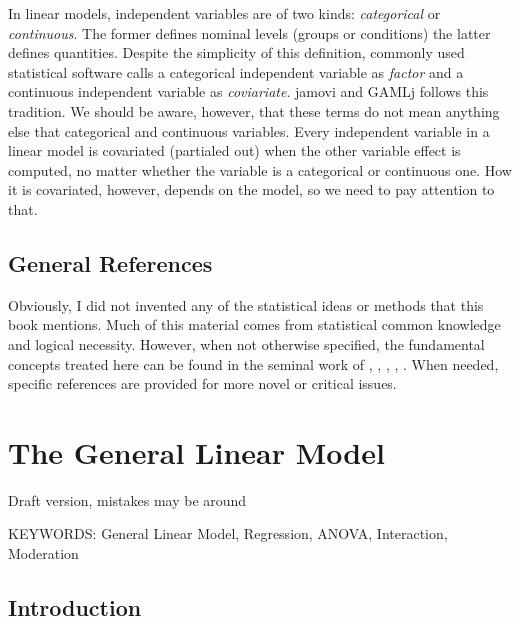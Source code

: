 \documentclass[
]{book}
\begin{document}
In linear models, independent variables are of two kinds: \emph{categorical} or \emph{continuous}. The former defines nominal levels (groups or conditions) the latter defines quantities. Despite the simplicity of this definition, commonly used statistical software calls a categorical independent variable as \emph{factor} and a continuous independent variable as \emph{coviariate}. {jamovi} and {GAMLj} follows this tradition. We should be aware, however, that these terms do not mean anything else that categorical and continuous variables. Every independent variable in a linear model is covariated (partialed out) when the other variable effect is computed, no matter whether the variable is a categorical or continuous one. How it is covariated, however, depends on the model, so we need to pay attention to that.

\hypertarget{general-references}{%
\section{General References}\label{general-references}}

Obviously, I did not invented any of the statistical ideas or methods that this book mentions. Much of this material comes from statistical common knowledge and logical necessity. However, when not otherwise specified, the fundamental concepts treated here can be found in the seminal work of \citet{cohen2014applied}, \citet{searle2016linear}, \citet{raudenbush2002hierarchical}, \citet{agresticategorical}, \citet{aiken1991multiple}. When needed, specific references are provided for more novel or critical issues.

\hypertarget{glm}{%
\chapter{The General Linear Model}\label{glm}}

{ Draft version, mistakes may be around }

\begin{flushright} KEYWORDS: General Linear Model, Regression, ANOVA, Interaction, Moderation  \end{flushright}

\hypertarget{introduction}{%
\section{Introduction}\label{introduction}}
\end{document}
